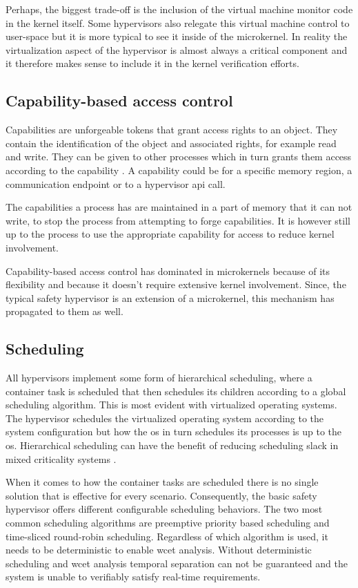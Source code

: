 Perhaps, the biggest trade-off is the inclusion of the virtual machine monitor code in the kernel itself. Some hypervisors also relegate this virtual machine control to user-space but it is more typical to see it inside of the microkernel. In reality the virtualization aspect of the hypervisor is almost always a critical component and it therefore makes sense to include it in the kernel verification efforts. 

\subsection{Capability-based access control}
Capabilities are unforgeable tokens that grant access rights to an object. They contain the identification of the object and associated rights, for example read and write.
They can be given to other processes which in turn grants them access according to the capability \cite{Levy.1984}. A capability could be for a specific memory region, a communication endpoint or to a hypervisor \acrshort{api} call.

The capabilities a process has are maintained in a part of memory that it can not write, to stop the process from attempting to forge capabilities. It is however still up to the process to use the appropriate capability for access to reduce kernel involvement.

Capability-based access control has dominated in microkernels because of its flexibility and because it doesn't require extensive kernel involvement. Since, the typical safety hypervisor is an extension of a microkernel, this mechanism has propagated to them as well.

\subsection{Scheduling}
All hypervisors implement some form of hierarchical scheduling, where a container task is scheduled that then schedules its children according to a global scheduling algorithm. This is most evident with virtualized operating systems. The hypervisor schedules the virtualized operating system according to the system configuration but how the \acrshort{os} in turn schedules its processes is up to the \acrshort{os}. Hierarchical scheduling can have the benefit of reducing scheduling slack in mixed criticality systems \cite{MalcolmS.Mollison.2010}. 

When it comes to how the container tasks are scheduled there is no single solution that is effective for every scenario. Consequently, the basic safety hypervisor offers different configurable scheduling behaviors. The two most common scheduling algorithms are preemptive priority based scheduling and time-sliced round-robin scheduling. Regardless of which algorithm is used, it needs to be deterministic to enable \acrlong{wcet} analysis. Without deterministic scheduling and \acrshort{wcet} analysis temporal separation can not be guaranteed and the system is unable to verifiably satisfy real-time requirements.

